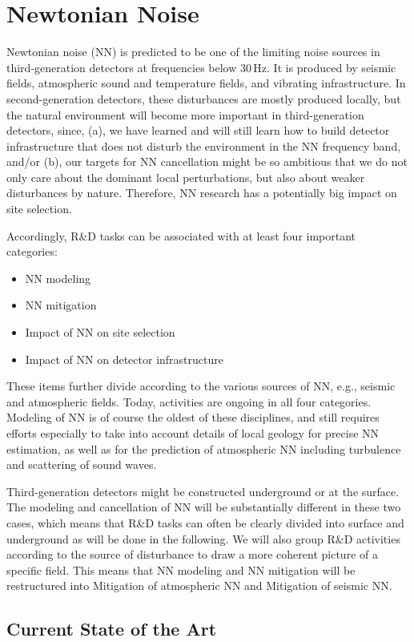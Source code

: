 \section{Newtonian Noise}
Newtonian noise (NN) is predicted to be one of the limiting noise sources in third-generation detectors at frequencies below 30\,Hz. It is produced by seismic fields, atmospheric sound and temperature fields, and vibrating infrastructure. In second-generation detectors, these disturbances are mostly produced locally, but the natural environment will become more important in third-generation detectors, since, (a), we have learned and will still learn how to build detector infrastructure that does not disturb the environment in the NN frequency band, and/or (b), our targets for NN cancellation might be so ambitious that we do not only care about the dominant local perturbations, but also about weaker disturbances by nature. Therefore, NN research has a potentially big impact on site selection. 

Accordingly, R\&D tasks can be associated with at least four important categories:
\begin{itemize}
\item NN modeling
\item NN mitigation
\item Impact of NN on site selection
\item Impact of NN on detector infrastructure
\end{itemize}
These items further divide according to the various sources of NN, e.g., seismic and atmospheric fields. Today, activities are ongoing in all four categories. Modeling of NN is of course the oldest of these disciplines, and still requires efforts especially to take into account details of local geology for precise NN estimation, as well as for the prediction of atmospheric NN including turbulence and scattering of sound waves. 

Third-generation detectors might be constructed underground or at the surface. The modeling and cancellation of NN will be substantially different in these two cases, which means that R\&D tasks can often be clearly divided into surface and underground as will be done in the following.  We will also group R\&D activities according to the source of disturbance to draw a more coherent picture of a specific field. This means that NN modeling and NN mitigation will be restructured into Mitigation of atmospheric NN and Mitigation of seismic NN. 

\subsection{Current State of the Art}

